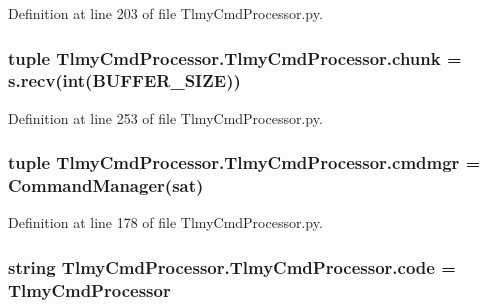 Definition at line 203 of file Tlmy\+Cmd\+Processor.\+py.

\hypertarget{namespace_tlmy_cmd_processor_1_1_tlmy_cmd_processor_a1ed237493e0f74a1a922ee4b54ef0657}{}
\subsubsection[{chunk}]{\setlength{\rightskip}{0pt plus 5cm}tuple Tlmy\+Cmd\+Processor.\+Tlmy\+Cmd\+Processor.\+chunk = s.\+recv(int({\bf B\+U\+F\+F\+E\+R\+\_\+\+S\+I\+Z\+E}))}\label{namespace_tlmy_cmd_processor_1_1_tlmy_cmd_processor_a1ed237493e0f74a1a922ee4b54ef0657}


Definition at line 253 of file Tlmy\+Cmd\+Processor.\+py.

\hypertarget{namespace_tlmy_cmd_processor_1_1_tlmy_cmd_processor_a4539a77a980ef2d5c22b5ed69ea58b9c}{}
\subsubsection[{cmdmgr}]{\setlength{\rightskip}{0pt plus 5cm}tuple Tlmy\+Cmd\+Processor.\+Tlmy\+Cmd\+Processor.\+cmdmgr = {\bf Command\+Manager}({\bf sat})}\label{namespace_tlmy_cmd_processor_1_1_tlmy_cmd_processor_a4539a77a980ef2d5c22b5ed69ea58b9c}


Definition at line 178 of file Tlmy\+Cmd\+Processor.\+py.

\hypertarget{namespace_tlmy_cmd_processor_1_1_tlmy_cmd_processor_a4b093dcc82bbec72c8869f3715934d92}{}
\subsubsection[{code}]{\setlength{\rightskip}{0pt plus 5cm}string Tlmy\+Cmd\+Processor.\+Tlmy\+Cmd\+Processor.\+code = \textquotesingle{}Tlmy\+Cmd\+Processor\textquotesingle{}}\label{namespace_tlmy_cmd_processor_1_1_tlmy_cmd_processor_a4b093dcc82bbec72c8869f3715934d92}


